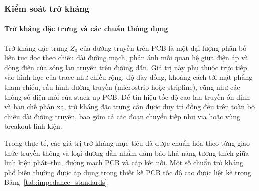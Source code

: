                 \subsubsection{Kiểm soát trở kháng}
                    \paragraph{Trở kháng đặc trưng và các chuẩn thông dụng}
                        Trở kháng đặc trưng \(Z_0\) của đường truyền trên PCB là một đại lượng phân bố liên tục dọc theo chiều dài đường mạch, phản ánh mối quan hệ giữa điện áp và dòng điện của sóng lan truyền trên đường dẫn. Giá trị này phụ thuộc trực tiếp vào hình học của trace như chiều rộng, độ dày đồng, khoảng cách tới mặt phẳng tham chiếu, cấu hình đường truyền (microstrip hoặc stripline), cũng như các thông số điện môi của stack-up PCB. Để tín hiệu tốc độ cao lan truyền ổn định và hạn chế phản xạ, trở kháng đặc trưng cần được duy trì đồng đều trên toàn bộ chiều dài đường truyền, bao gồm cả các đoạn chuyển tiếp như via hoặc vùng breakout linh kiện.

                        Trong thực tế, các giá trị trở kháng mục tiêu đã được chuẩn hóa theo từng giao thức truyền thông và loại đường dẫn nhằm đảm bảo khả năng tương thích giữa linh kiện phát–thu, đường mạch PCB và cáp kết nối. Một số chuẩn trở kháng phổ biến thường được áp dụng trong thiết kế PCB tốc độ cao được liệt kê trong Bảng~\ref{tab:impedance_standards}.
                        
